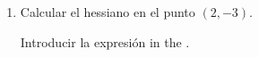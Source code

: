 \begin{enumerate}[leftmargin=*]
\begin{enumerate}
      \item Calcular el hessiano en el punto $(2,-3)$.
            \begin{indication}
            Introducir la expresión  in the .
            \end{indication}
      \end{enumerate}



\end{enumerate}
